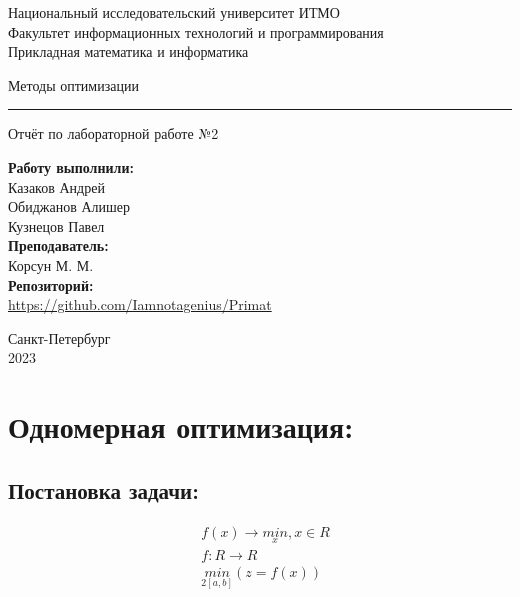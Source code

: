\documentclass[fleqn]{article}
\begin{document}
    \begin{center}
    Национальный исследовательский университет ИТМО \\
    Факультет информационных технологий и программирования \\
    Прикладная математика и информатика
\end{center}
\vspace{20em}
\begin{center}
    {\Large Методы оптимизации}
    \vspace{3pt}
    \hrule
    \vspace{3pt}
    Отчёт по лабораторной работе №2
\end{center}
\vspace{20em}
\begin{flushright}
    \textbf{ Работу выполнили: } \\
    Казаков Андрей \\
    Обиджанов Алишер \\
    Кузнецов Павел \\

    \vspace{1em}
    \textbf{ Преподаватель: } \\
    Корсун М. М.\\

    \vspace{1em}
    \textbf{ Репозиторий: }\\
    \url{https://github.com/Iamnotagenius/Primat}
\end{flushright}
\vspace{10em}
\begin{center}
    Санкт-Петербург \\
    2023
\end{center}

\newpage

\section*{Одномерная оптимизация:}
\subsection*{Постановка задачи:}
\begin{align*}
    &f(x) \rightarrow \underset{x}{min}, x \in R\\
    &f: R \rightarrow R\\
    &\underset{2[a,b]}{min}(z=f(x))
\end{align*}
\end{document}

